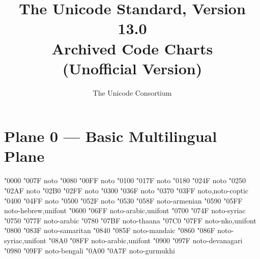 \documentclass{article}
\title{The Unicode Standard, Version 13.0\\
  Archived Code Charts\\
  (Unofficial Version)}
\author{The Unicode Consortium}
\begin{document}
\maketitle
\tableofcontents

\section{Plane 0 --- Basic Multilingual Plane}

                    {  "0000} {  "007F} {noto}
             {  "0080} {  "00FF} {noto}
                               {  "0100} {  "017F} {noto}
                               {  "0180} {  "024F} {noto}
                                 {  "0250} {  "02AF} {noto}
                       {  "02B0} {  "02FF} {noto}
                    {  "0300} {  "036F} {noto}
                               {  "0370} {  "03FF} {noto,noto-coptic}
                                       {  "0400} {  "04FF} {noto}
                            {  "0500} {  "052F} {noto}
                                       {  "0530} {  "058F} {noto-armenian}
                                         {  "0590} {  "05FF} {noto-hebrew,unifont}
                                         {  "0600} {  "06FF} {noto-arabic,unifont}
                                         {  "0700} {  "074F} {noto-syriac}
                              {  "0750} {  "077F} {noto-arabic}
                                         {  "0780} {  "07BF} {noto-thaana}
                                            {  "07C0} {  "07FF} {noto-nko,unifont}
                                      {  "0800} {  "083F} {noto-samaritan}
                                        {  "0840} {  "085F} {noto-mandaic}
                              {  "0860} {  "086F} {noto-syriac,unifont}
                              {  "08A0} {  "08FF} {noto-arabic,unifont}
                                     {  "0900} {  "097F} {noto-devanagari}
                                        {  "0980} {  "09FF} {noto-bengali}
                                       {  "0A00} {  "0A7F} {noto-gurmukhi}
\end{document}
